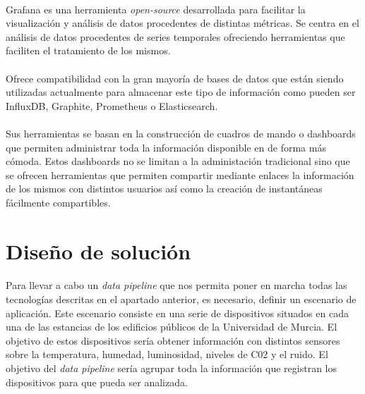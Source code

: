 \documentclass[12pt, a4paper]{article}
\begin{document}
        \paragraph{}
        Grafana es una herramienta \textit{open-source} desarrollada para facilitar la visualización y análisis de datos procedentes de distintas métricas. Se centra en el análisis de datos procedentes de series temporales ofreciendo herramientas que faciliten el tratamiento de los mismos.

        \paragraph{}
        Ofrece compatibilidad con la gran mayoría de bases de datos que están siendo utilizadas actualmente para almacenar este tipo de información como pueden ser InfluxDB, Graphite, Prometheus o Elasticsearch.

        \paragraph{}
        Sus herramientas se basan en la construcción de cuadros de mando o dashboards que permiten administrar toda la información disponible en de forma más cómoda. Estos dashboards no se limitan a la administación tradicional sino que se ofrecen herramientas que permiten compartir mediante enlaces la información de los mismos con distintos usuarios así como la creación de instantáneas fácilmente compartibles.

        \section{Diseño de solución}

        \paragraph{}
        Para llevar a cabo un \textit{data pipeline} que nos permita poner en marcha todas las tecnologías descritas en el apartado anterior, es necesario, definir un escenario de aplicación. Este escenario consiste en una serie de dispositivos situados en cada una de las estancias de los edificios públicos de la Universidad de Murcia. El objetivo de estos dispositivos sería obtener información con distintos sensores sobre la temperatura, humedad, luminosidad, niveles de C02 y el ruido. El objetivo del \textit{data pipeline} sería agrupar toda la información que registran los dispositivos para que pueda ser analizada.
        
\end{document}
